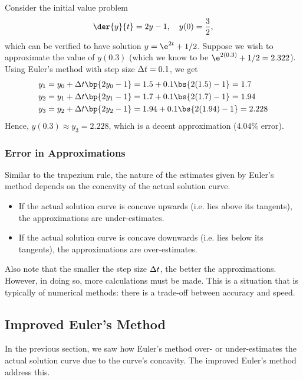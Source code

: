 \begin{example}\label{eg:Eulers-Method}
    Consider the initial value problem \[\der{y}{t} = 2y - 1, \quad y(0) = \frac32,\] which can be verified to have solution $y = \e^{2t} + 1/2$. Suppose we wish to approximate the value of $y(0.3)$ (which we know to be $\e^{2(0.3)} + 1/2 = 2.322$). Using Euler's method with step size $\Delta t = 0.1$, we get
    \begin{align*}
        y_1 &= y_0 + \D t \bp{2y_0 - 1} = 1.5 + 0.1 \bs{2(1.5) - 1} = 1.7\\
        y_2 &= y_1 + \D t \bp{2y_1 - 1} = 1.7 + 0.1 \bs{2(1.7) - 1} = 1.94\\
        y_3 &= y_2 + \D t \bp{2y_2 - 1} = 1.94 + 0.1 \bs{2(1.94) - 1} = 2.228
    \end{align*}
    Hence, $y(0.3) \approx y_3 = 2.228$, which is a decent approximation (4.04\% error).
\end{example}

\subsubsection{Error in Approximations}

Similar to the trapezium rule, the nature of the estimates given by Euler's method depends on the concavity of the actual solution curve.
\begin{itemize}
    \item If the actual solution curve is concave upwards (i.e. lies above its tangents), the approximations are under-estimates.
    \item If the actual solution curve is concave downwards (i.e. lies below its tangents), the approximations are over-estimates.
\end{itemize}

Also note that the smaller the step size $\Delta t$, the better the approximations. However, in doing so, more calculations must be made. This is a situation that is typically of numerical methods: there is a trade-off between accuracy and speed.

\subsection{Improved Euler's Method}

In the previous section, we saw how Euler's method over- or under-estimates the actual solution curve due to the curve's concavity. The improved Euler's method address this.

